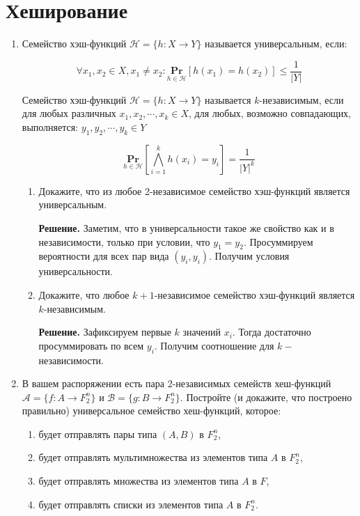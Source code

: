 \section*{Хеширование}
\begin{enumerate}
	\item Семейство хэш-функций $\mathcal{H} = \{h : X \rightarrow Y \}$ называется универсальным, если:
	
	\begin{equation*}
	\forall x_1, x_2 \in X, x_1 \neq x_2 : \underset{h \in \mathcal{H}}{\mathbf{Pr}} \left[h(x_1) = h(x_2)\right] 
	\leqslant \frac{1}{|Y|}
	\end{equation*}
	
	Семейство хэш-функций $\mathcal{H} = \{h : X \rightarrow Y \}$ называется $k$-независимым, если для любых 
	различных $x_1, x_2, \cdots , x_k \in X$, для любых, возможно совпадающих, выполняется: $y_1, y_2, \cdots, 
	y_k \in Y$
	
	\begin{equation*}
	 \underset{h \in \mathcal{H}}{\mathbf{Pr}} \left[\bigwedge\limits_{i = 1}^{k} h(x_i) = y_i\right] = 
	 \frac{1}{|Y|^k}
	\end{equation*}
		
	\begin{enumerate}
		\item Докажите, что из любое 2-независимое семейство хэш-функций является универсальным.
		
		\textbf{Решение.} Заметим, что в универсальности такое же свойство как и в независимости, только при 
		условии, что $y_1 = y_2$. Просуммируем вероятности для всех пар вида $(y_i, y_i)$. Получим условия 
		универсальности.
		
		\item Докажите, что любое $k + 1$-независимое семейство хэш-функций является $k$-независимым.
		
		\textbf{Решение.} Зафиксируем первые $k$ значений $x_i$. Тогда достаточно просуммировать по всем $y_i$. Получим соотношение для $k-$ независимости.
		
	\end{enumerate}
	
	
	\item В вашем распоряжении есть пара 2-независимых семейств хеш-функций $\mathcal{A} = \{f : A \rightarrow 
	F_2^n \}$ и $\mathcal{B} = \{g : B \rightarrow F_2^n \}$. Постройте (и докажите, что построено правильно) 
	универсальное семейство хеш-функций, которое:
	\begin{enumerate}
		\item будет отправлять пары типа $(A, B)$ в $F_2^n$,
		\item будет отправлять мультимножества из элементов типа $A$ в $F_2^n$,
		\item будет отправлять множества из элементов типа $A$ в $F$,
		\item будет отправлять списки из элементов типа $A$ в $F_2^n$.
	\end{enumerate}
	

\end{enumerate}

